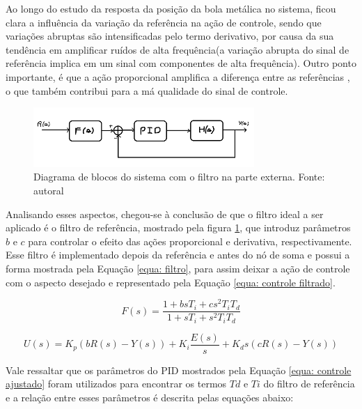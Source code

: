 \documentclass{ifacconf}
\begin{document}
Ao longo do estudo da resposta da posição da bola metálica no sistema, ficou clara a influência da variação da referência na ação de controle, sendo que variações abruptas são 
intensificadas pelo termo derivativo, por causa da sua tendência em amplificar ruídos de alta frequência(a variação abrupta do sinal de referência implica em um sinal com componentes 
de alta frequência). Outro ponto importante, é que a ação proporcional amplifica a diferença entre as referências , o que também contribui para a má qualidade do sinal de controle.

\begin{figure}[!htb]
  \begin{center}
  \includegraphics[width=8.4cm]{figures/Diagrama filtro.png}    %
  \caption{Diagrama de blocos do sistema com o filtro na parte externa. Fonte: autoral} 
  \label{fig:diagrama_filtro}
  \end{center}
\end{figure}

Analisando esses aspectos, chegou-se à conclusão de que o filtro ideal a ser aplicado é o filtro de referência, mostrado pela figura \ref{fig:diagrama_filtro}, que introduz parâmetros $b$ e $c$ para controlar o efeito das ações 
proporcional e derivativa, respectivamente. Esse filtro é implementado depois da referência e antes do nó de soma e possui a forma mostrada pela Equação \ref{equa: filtro}, para assim deixar 
a ação de controle com o aspecto desejado e representado pela Equação \ref{equa: controle filtrado}.

\begin{equation}
  F(s) = \frac{1+bsT_{i}+cs^2T_{i}T_{d}}{1+sT_{i}+s^2T_{i}T_{d}}
  \label{equa: filtro}
\end{equation}

\begin{equation}
  U(s) = K_{p}(bR(s)-Y(s)) + K_{i}\frac{E(s)}{s} + K_{d}s(cR(s)-Y(s))
  \label{equa: controle filtrado}
\end{equation}

Vale ressaltar que os parâmetros do PID mostrados pela Equação \ref{equa: controle ajustado} foram utilizados para encontrar os termos $Td$ e $Ti$ do filtro de referência e a relação entre esses parâmetros 
é descrita pelas equações abaixo:
\end{document}

